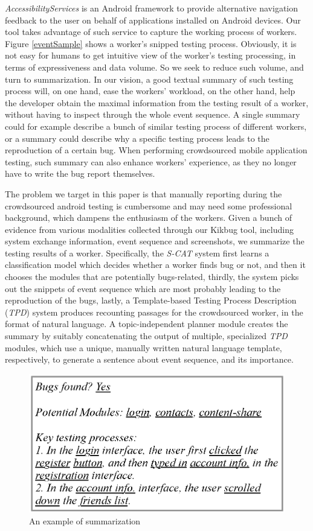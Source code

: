 \documentclass[10pt,conference]{IEEEtran}
\begin{document}
\emph{AccessibilityServices} is an Android framework to provide alternative navigation feedback to the user on behalf of
applications installed on Android devices. Our tool takes advantage of such service to capture the working process of workers.
Figure \ref{eventSample} shows a worker's snipped testing process. Obviously, it is not easy for humans to get intuitive view of
the worker's testing processing, in terms of expressiveness and data volume. So we seek to reduce such volume, and turn to summarization.
In our vision, a good textual summary of such testing process will, on one hand, ease the workers' workload, on the other hand, help the developer obtain the maximal information from the
testing result of a worker, without having to inspect through the whole event sequence. A single summary could for example describe
a bunch of similar testing process of different workers, or a summary could describe why a specific testing process leads to the reproduction
of a certain bug. When performing crowdsourced mobile application testing, such summary can also enhance workers' experience,
as they no longer have to write the bug report themselves.
 

The problem we target in this paper is that manually reporting during the crowdsourced android testing is cumbersome
and may need some professional background, which dampens the enthusiasm of the workers.
Given a bunch of evidence from various modalities collected through our Kikbug tool, including system exchange information, event sequence
and screenshots, we summarize the testing results of a worker. Specifically, the \emph{S-CAT} system first learns a classification model which
decides whether a worker finds bug or not, and then it chooses the modules that are potentially bugs-related, thirdly, the system picks out the
snippets of event sequence which are most probably leading to the reproduction of the bugs, lastly, a Template-based Testing Process Description (\emph{TPD})
system produces recounting passages for the crowdsourced worker, in the format of natural language. A topic-independent planner module creates the
summary by suitably concatenating the output of multiple, specialized \emph{TPD} modules, which use a unique, manually written
natural language template, respectively, to generate a sentence about event sequence, and its importance.


\begin{figure}[!t]
\centering
\includegraphics[width=0.73\columnwidth]{Figure/SummarySample}
\caption{An example of summarization}
\label{fig:sumsample}
\end{figure}
\end{document}

